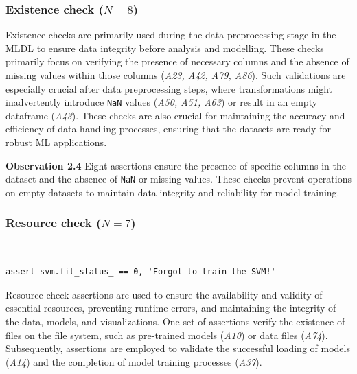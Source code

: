 \documentclass[smallextended]{svjour3}       %
\newcommand{\highlight}[1]{\begin{framed}%
  \noindent#1
\end{framed}}
\providecommand{\DIFaddbegin}{} %
\providecommand{\DIFaddend}{} %
\providecommand{\DIFdelbegin}{} %
\providecommand{\DIFdelend}{} %
\newcommand{\DIFscaledelfig}{0.5}
\newlength{\DIFdelgraphicswidth} %
\newlength{\DIFdelgraphicsheight} %
\newcommand{\DIFaddincludegraphics}[2][]{{\color{blue}\fbox{\DIFOincludegraphics[#1]{#2}}}} %
\newcommand{\DIFdelincludegraphics}[2][]{%
\sbox{\DIFdelgraphicsbox}{\DIFOincludegraphics[#1]{#2}}%
\settoboxwidth{\DIFdelgraphicswidth}{\DIFdelgraphicsbox} %
\settoboxtotalheight{\DIFdelgraphicsheight}{\DIFdelgraphicsbox} %
\scalebox{\DIFscaledelfig}{%
\parbox[b]{\DIFdelgraphicswidth}{\usebox{\DIFdelgraphicsbox}\\[-\baselineskip] \rule{\DIFdelgraphicswidth}{0em}}\llap{\resizebox{\DIFdelgraphicswidth}{\DIFdelgraphicsheight}{%
\setlength{\unitlength}{\DIFdelgraphicswidth}%
\begin{picture}(1,1)%
\thicklines\linethickness{2pt} %
{\color[rgb]{1,0,0}\put(0,0){\framebox(1,1){}}}%
{\color[rgb]{1,0,0}\put(0,0){\line( 1,1){1}}}%
{\color[rgb]{1,0,0}\put(0,1){\line(1,-1){1}}}%
\end{picture}%
}\hspace*{3pt}}} %
} %
\DeclareRobustCommand{\DIFaddbegin}{\DIFOaddbegin \let\includegraphics\DIFaddincludegraphics} %
\DeclareRobustCommand{\DIFaddend}{\DIFOaddend \let\includegraphics\DIFOincludegraphics} %
\DeclareRobustCommand{\DIFdelbegin}{\DIFOdelbegin \let\includegraphics\DIFdelincludegraphics} %
\DeclareRobustCommand{\DIFdelend}{\DIFOaddend \let\includegraphics\DIFOincludegraphics} %
\begin{document}
\subsubsection{Existence check ($N = 8$)}

Existence checks are primarily used during the data preprocessing stage in the MLDL to ensure data integrity before analysis and modelling. These checks primarily focus on verifying the presence of necessary columns and the absence of missing values within those columns (\emph{A23, A42, A79, A86}). Such validations are especially crucial after data preprocessing steps, where transformations might inadvertently introduce \lstinline{NaN} values (\emph{A50, A51, A63}) or result in an empty dataframe (\emph{A43}). These checks are also crucial for maintaining the accuracy and efficiency of data handling processes, ensuring that the datasets are ready for robust ML applications.

\DIFdelbegin %
\DIFdelend \DIFaddbegin \highlight{\textbf{Observation 2.4} Eight assertions ensure the presence of specific columns in the dataset and the absence of \texttt{NaN} or missing values. These checks prevent operations on empty datasets to maintain data integrity and reliability for model training.}
\DIFaddend 

\subsubsection{Resource check ($N = 7$)}~\label{sec:result-rq2-resource-check}

\begin{lstlisting}[caption={Assertion \emph{A37} used to ensure that an ML model has not reached an inconsistent state due to out-of-order or re-execution of code cells.}, label={lst:A37}]
assert svm.fit_status_ == 0, 'Forgot to train the SVM!'
\end{lstlisting}

Resource check assertions are used to ensure the availability and validity of essential resources, preventing runtime errors, and maintaining the integrity of the data, models, and visualizations. One set of assertions verify the existence of files on the file system, such as pre-trained models (\emph{A10}) or data files (\emph{A74}). Subsequently, assertions are employed to validate the successful loading of models (\emph{A14}) and the completion of model training processes (\emph{A37}).
\end{document}
